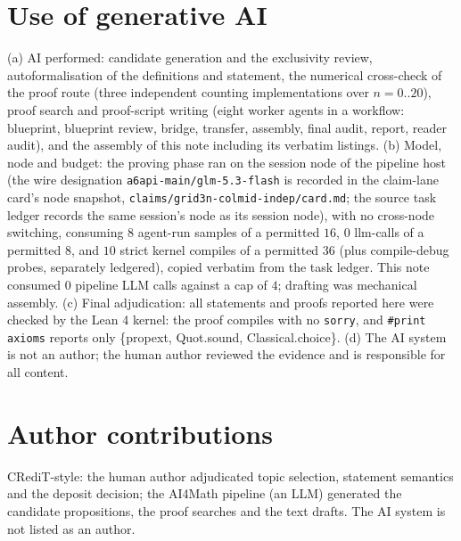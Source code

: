\documentclass[11pt]{article}
\begin{document}
\section*{Use of generative AI}

(a) AI performed: candidate generation and the exclusivity review,
autoformalisation of the definitions and statement, the numerical
cross-check of the proof route (three independent counting implementations
over $n = 0..20$), proof search and proof-script writing (eight worker
agents in a workflow: blueprint, blueprint review, bridge, transfer,
assembly, final audit, report, reader audit), and the assembly of this note
including its verbatim listings. (b) Model, node and budget: the proving
phase ran on the session node of the pipeline host (the wire designation
\texttt{a6api-main/glm-5.3-flash} is recorded in the claim-lane card's node
snapshot,
\texttt{claims/grid3n-colmid-indep/card.md}; the source task ledger records
the same session's node as its session node), with no cross-node switching,
consuming $8$ agent-run
samples of a permitted $16$, $0$ llm-calls of a permitted $8$, and $10$
strict kernel compiles of a permitted $36$ (plus compile-debug probes,
separately ledgered), copied verbatim from the task ledger. This note
consumed $0$ pipeline LLM calls against a cap of $4$; drafting was
mechanical assembly. (c) Final adjudication: all statements and proofs
reported here were checked by the Lean 4 kernel: the proof compiles with no
\texttt{sorry}, and \texttt{\#print axioms} reports only \{propext,
Quot.sound, Classical.choice\}. (d) The AI system is not an author; the
human author reviewed the evidence and is responsible for all content.

\section*{Author contributions}

CRediT-style: the human author adjudicated topic selection, statement
semantics and the deposit decision; the AI4Math pipeline (an LLM) generated
the candidate propositions, the proof searches and the text drafts. The AI
system is not listed as an author.
\end{document}
